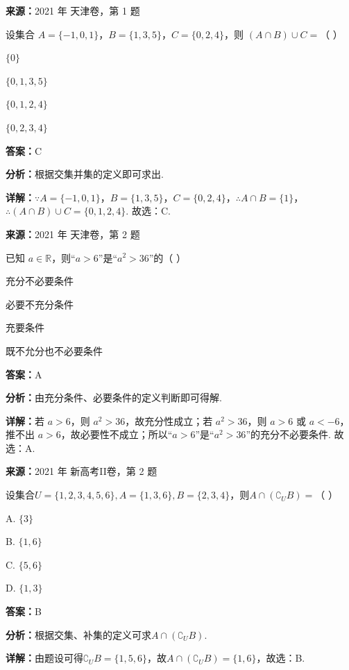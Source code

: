 \begin{question}[points=5]
\textbf{来源：}2021 年 天津卷，第 1 题\par
设集合 $A = \{-1,0,1\}$，$B = \{1,3,5\}$，$C = \{0,2,4\}$，则 $(A \cap B) \cup C =$（   ）
\begin{choices}
  \item $\{0\}$
  \item $\{0,1,3,5\}$
  \item $\{0,1,2,4\}$
  \item $\{0,2,3,4\}$
\end{choices}
\begin{solution}
\textbf{答案：}C

\textbf{分析：}根据交集并集的定义即可求出.

\textbf{详解：}$\because A = \{-1,0,1\}$，$B = \{1,3,5\}$，$C = \{0,2,4\}$，$\therefore A \cap B = \{1\}$，$\therefore (A \cap B) \cup C = \{0,1,2,4\}$. 故选：C.
\end{solution}
\end{question}

\begin{question}[points=5]
\textbf{来源：}2021 年 天津卷，第 2 题\par
已知 $a \in \mathbb{R}$，则“$a > 6$”是“$a^2 > 36$”的（   ）
\begin{choices}
  \item 充分不必要条件
  \item 必要不充分条件
  \item 充要条件
  \item 既不允分也不必要条件
\end{choices}
\begin{solution}
\textbf{答案：}A

\textbf{分析：}由充分条件、必要条件的定义判断即可得解.

\textbf{详解：}若 $a > 6$，则 $a^2 > 36$，故充分性成立；若 $a^2 > 36$，则 $a > 6$ 或 $a < -6$，推不出 $a > 6$，故必要性不成立；所以“$a > 6$”是“$a^2 > 36$”的充分不必要条件. 故选：A.
\end{solution}
\end{question}

\begin{question}[points=5]
\textbf{来源：}2021 年 新高考II卷，第 2 题\par
设集合$U=\{1,2,3,4,5,6\},A=\{1,3,6\},B=\{2,3,4\}$，则$A\cap(\complement_U B)=$（ ）
\begin{choices}
  \item A. $\{3\}$
  \item B. $\{1,6\}$
  \item C. $\{5,6\}$
  \item D. $\{1,3\}$
\end{choices}
\begin{solution}
\textbf{答案：}B

\textbf{分析：}根据交集、补集的定义可求$A\cap(\complement_U B)$.

\textbf{详解：}由题设可得$\complement_U B=\{1,5,6\}$，故$A\cap(\complement_U B)=\{1,6\}$，故选：B.
\end{solution}
\end{question}

